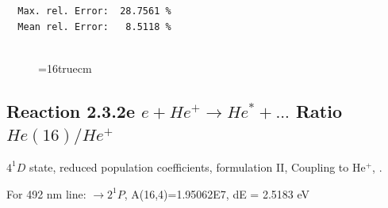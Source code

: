 \documentclass[12pt,dvips]{article}
\begin{document}
\begin{small}
\begin{verbatim}
  Max. rel. Error:  28.7561 %
  Mean rel. Error:   8.5118 %


\end{verbatim}\end{small}
\begin{figure} \label{2.3.2d}
\epsfxsize=16truecm
\end{figure}
\newpage


\subsection{
  Reaction 2.3.2e $e + He^+ \rightarrow He^* + ... $ Ratio $He(16)/He^+$
}

  $4^1D$ state,
  reduced population coefficients, formulation II,
  Coupling to He$^+$, \cite{kn:Fujimoto}.

  For 492 nm line: $\rightarrow 2^1P$, A(16,4)=1.95062E7, dE = 2.5183 eV
\end{document}
